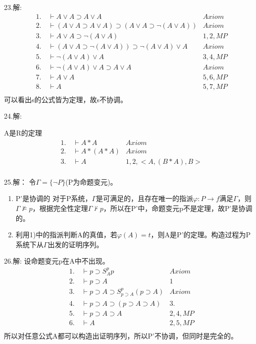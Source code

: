 \documentclass[a4paper]{ctexart}
\begin{document}
\noindent 23.解:
\begin{align*}
  &1.\quad \vdash A\vee A\supset A\vee A &Axiom \\
  &2.\quad \vdash (A\vee A\supset A\vee A) \supset \left(A\vee A\supset \neg(A\vee A)\right) &Axiom \\
  &3.\quad \vdash A\vee A\supset \neg(A\vee A) &1,2,MP \\
  &4.\quad \vdash \left(A\vee A\supset \neg(A\vee A)\right)\supset \neg(A\vee A)\vee A &Axiom \\
  &5.\quad \vdash \neg(A\vee A)\vee A &3,4,MP \\
  &6.\quad \vdash \neg(A\vee A)\vee A\supset A\vee A &Axiom \\
  &7.\quad \vdash A\vee A &5,6,MP \\
  &8.\quad \vdash A &5,7,MP \\
\end{align*}
可以看出s的公式皆为定理，故s不协调。\newline

\noindent 24.解:

A是R的定理
\begin{align*}
  &1.\quad \vdash A*A &Axiom \\
  &2.\quad \vdash A*(A*A) &Axiom \\
  &3.\quad \vdash A &1,2,<A,(B*A),B> \\
\end{align*}

\noindent 25.解：
令$\Gamma=\{\neg P\}$(P为命题变元)。
\begin{enumerate}
  \item P'是协调的
  对于P系统，$\Gamma$是可满足的，且存在唯一的指派$\varphi:{P}\rightarrow f$满足$\Gamma$，则$\Gamma\not\models p$，根据完全性定理$\Gamma\not\vdash p$，所以在P'中，命题变元p不是定理，故P'是协调的。
  \item 利用1)中的指派判断A的真值，若$\varphi(A)=t$，则A是P'的定理。构造过程为P系统下从$\Gamma$出发的证明序列。
\end{enumerate}

\noindent 26.解:
设命题变元p在A中不出现。
\begin{align*}
  &1.\quad \vdash p\supset S_{A}^p p  &Axiom \\
  &2.\quad \vdash p\supset A &1 \\
  &3.\quad \vdash p\supset A\supset S_{p\supset A}^p(p\supset A) &Axiom \\
  &4.\quad \vdash p\supset A\supset(p\supset A\supset A) &3. \\
  &5.\quad \vdash p\supset A\supset A &2,4,MP \\
  &6.\quad \vdash A &2,5,MP \\
\end{align*}
所以对任意公式A都可以构造出证明序列，所以P'不协调，但同时是完全的。\newline
\end{document}
